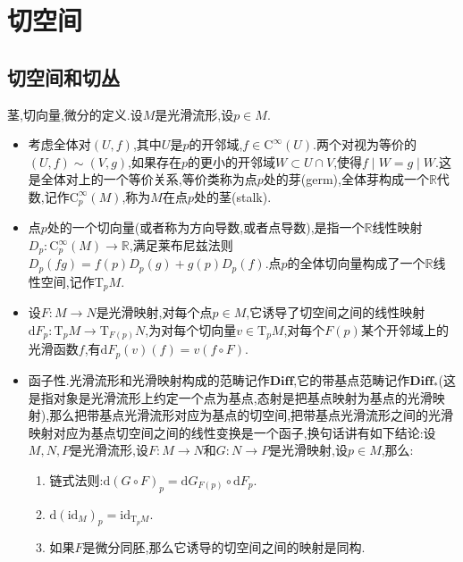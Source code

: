 \newpage
\section{切空间}
\subsection{切空间和切丛}

茎,切向量,微分的定义.设$M$是光滑流形,设$p\in M$.
\begin{itemize}
	\item 考虑全体对$(U,f)$,其中$U$是$p$的开邻域,$f\in\mathrm{C}^{\infty}(U)$.两个对视为等价的$(U,f)\sim(V,g)$,如果存在$p$的更小的开邻域$W\subset U\cap V$,使得$f\mid W=g\mid W$.这是全体对上的一个等价关系,等价类称为点$p$处的芽(germ),全体芽构成一个$\mathbb{R}$代数,记作$\mathrm{C}^{\infty}_p(M)$,称为$M$在点$p$处的茎(stalk).
	\item 点$p$处的一个切向量(或者称为方向导数,或者点导数),是指一个$\mathbb{R}$线性映射$D_p:\mathrm{C}^{\infty}_p(M)\to\mathbb{R}$,满足莱布尼兹法则$D_p(fg)=f(p)D_p(g)+g(p)D_p(f)$.点$p$的全体切向量构成了一个$\mathbb{R}$线性空间,记作$\mathrm{T}_pM$.
	\item 设$F:M\to N$是光滑映射,对每个点$p\in M$,它诱导了切空间之间的线性映射$\mathrm{d}F_p:\mathrm{T}_pM\to\mathrm{T}_{F(p)}N$,为对每个切向量$v\in\mathrm{T}_pM$,对每个$F(p)$某个开邻域上的光滑函数$f$,有$\mathrm{d}F_p(v)(f)=v(f\circ F)$.
	\item 函子性.光滑流形和光滑映射构成的范畴记作$\textbf{Diff}$,它的带基点范畴记作$\textbf{Diff}_*$(这是指对象是光滑流形上约定一个点为基点,态射是把基点映射为基点的光滑映射),那么把带基点光滑流形对应为基点的切空间,把带基点光滑流形之间的光滑映射对应为基点切空间之间的线性变换是一个函子,换句话讲有如下结论:设$M,N,P$是光滑流形,设$F:M\to N$和$G:N\to P$是光滑映射,设$p\in M$,那么:
	\begin{enumerate}
		\item 链式法则:$\mathrm{d}(G\circ F)_p=\mathrm{d}G_{F(p)}\circ\mathrm{d}F_p$.
		\item $\mathrm{d}(\mathrm{id}_M)_p=\mathrm{id}_{\mathrm{T}_pM}$.
		\item 如果$F$是微分同胚,那么它诱导的切空间之间的映射是同构.
	\end{enumerate}
\end{itemize}
